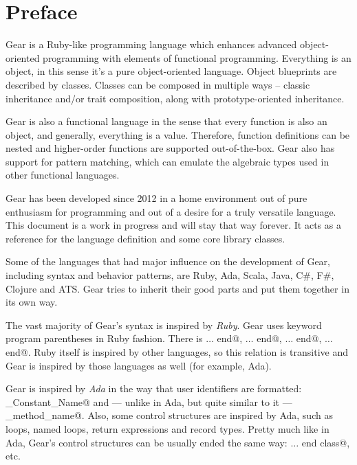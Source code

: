 
\section*{Preface}

Gear is a Ruby-like programming language which enhances advanced object-oriented programming with elements of functional programming. Everything is an object, in this sense it's a pure object-oriented language. Object blueprints are described by classes. Classes can be composed in multiple ways – classic inheritance and/or trait composition, along with prototype-oriented inheritance.

Gear is also a functional language in the sense that every function is also an object, and generally, everything is a value. Therefore, function definitions can be nested and higher-order functions are supported out-of-the-box. Gear also has support for pattern matching, which can emulate the algebraic types used in other functional languages.

Gear has been developed since 2012 in a home environment out of pure enthusiasm for programming and out of a desire for a truly versatile language. This document is a work in progress and will stay that way forever. It acts as a reference for the language definition and some core library classes.

Some of the languages that had major influence on the development of Gear, including syntax and behavior patterns, are Ruby, Ada, Scala, Java, C\#, F\#, Clojure and ATS. Gear tries to inherit their good parts and put them together in its own way.

The vast majority of Gear's syntax is inspired by \emph{Ruby}. Gear uses keyword program parentheses in Ruby fashion. There is \lstinline@class $\ldots$ end@, \lstinline@def $\ldots$ end@, \lstinline@do $\ldots$ end@, \lstinline@loop $\ldots$ end@. Ruby itself is inspired by other languages, so this relation is transitive and Gear is inspired by those languages as well (for example, Ada). 

Gear is inspired by \emph{Ada} in the way that user identifiers are formatted: \lstinline@Some_Constant_Name@ and — unlike in Ada, but quite similar to it — \lstinline@some_method_name@. Also, some control structures are inspired by Ada, such as loops, named loops, return expressions and record types. Pretty much like in Ada, Gear's control structures can be usually ended the same way: \lstinline@class $\ldots$ end class@, etc. 

